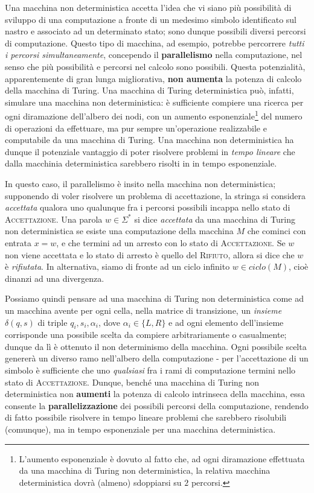 \documentclass[10pt]{book}
\begin{document}
Una macchina non deterministica accetta l'idea che vi siano più possibilità di
sviluppo di una computazione a fronte di un medesimo simbolo identificato sul
nastro e associato ad un determinato stato; sono dunque possibili diversi
percorsi di computazione. Questo tipo di macchina, ad esempio, potrebbe
percorrere \emph{tutti i percorsi simultaneamente}, concependo il
\textbf{parallelismo} nella computazione, nel senso che più possibilità e
percorsi nel calcolo sono possibili. Questa potenzialità, apparentemente di
gran lunga migliorativa, \textbf{non aumenta} la potenza di calcolo della
macchina di Turing. Una macchina di Turing deterministica può, infatti,
simulare una macchina non deterministica: è sufficiente compiere una ricerca
per ogni diramazione dell'albero dei nodi, con un aumento
esponenziale\footnote{L'aumento esponenziale è dovuto al fatto che, ad ogni
diramazione effettuata da una macchina di Turing non deterministica, la
relativa macchina deterministica dovrà (almeno) sdoppiarsi su $2$ percorsi.}
del numero di operazioni da effettuare, ma pur sempre un'operazione
realizzabile e computabile da una macchina di Turing. Una macchina non
deterministica ha dunque il potenziale vantaggio di poter risolvere problemi in
\emph{tempo lineare} che dalla macchinia deterministica sarebbero risolti in in
tempo esponenziale.

In questo caso, il parallelismo è insito nella macchina non deterministica;
supponendo di voler risolvere un problema di accettazione, la stringa si
considera \emph{accettata} qualora uno qualunque fra i percorsi possibili
incappa nello stato di \textsc{Accettazione}. Una parola $w \in \Sigma^*$ si
dice \emph{accettata} da una macchina di Turing non deterministica se esiste
una computazione della macchina $M$ che cominci con entrata $x=w$, e che
termini ad un arresto con lo stato di \textsc{Accettazione}. Se $w$ non viene
accettata e lo stato di arresto è quello del \textsc{Rifiuto}, allora si dice
che $w$ è \emph{rifiutata}. In alternativa, siamo di fronte ad un ciclo
infinito $w \in ciclo(M)$, cioè dinanzi ad una divergenza.

Possiamo quindi pensare ad una macchina di Turing non deterministica
come ad un macchina avente per ogni cella, nella matrice di transizione, un
\emph{insieme} $\delta(q,s)$ di triple $q_i, s_i, \alpha_i$, dove $\alpha_i \in
\{L,R\}$ e ad ogni elemento dell'insieme corrisponde una possibile scelta da
compiere arbitrariamente o casualmente; dunque da lì è ottenuto il non
determinismo della macchina. Ogni possibile scelta genererà un diverso ramo
nell'albero della computazione \-- per l'accettazione di un simbolo è
sufficiente che uno \emph{qualsiasi} fra i rami di computazione termini nello
stato di \textsc{Accettazione}. Dunque, benché una macchina di Turing non
deterministica non \textbf{aumenti} la potenza di calcolo intrinseca della
macchina, essa consente la \textbf{parallelizzazione} dei possibili percorsi
della computazione, rendendo di fatto possibile risolvere in tempo lineare
problemi che sarebbero risolubili (comunque), ma in tempo esponenziale per una
macchina deterministica.
\end{document}
